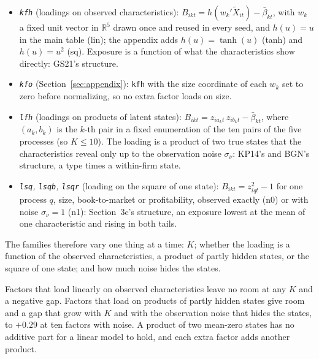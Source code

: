 \documentclass[11pt]{article}
\begin{document}
\begin{itemize}
  \begin{itemize}
  \item \emph{\texttt{kfh}} (loadings on observed characteristics): $B_{ikt}=h(w_k'\tilde X_{it})-\bar\beta_{kt}$, with $w_k$ a fixed unit vector in $\mathbb{R}^5$ drawn once and reused in every seed, and $h(u)=u$ in the main table (lin); the appendix adds $h(u)=\tanh(u)$ (tanh) and $h(u)=u^2$ (sq). Exposure is a function of what the characteristics show directly: GS21's structure.
  \item \emph{\texttt{kfo}} (Section~\ref{sec:appendix}): \texttt{kfh} with the size coordinate of each $w_k$ set to zero before normalizing, so no extra factor loads on size.
  \item \emph{\texttt{lfh}} (loadings on products of latent states): $B_{ikt}=z_{ia_kt}\,z_{ib_kt}-\bar\beta_{kt}$, where $(a_k,b_k)$ is the $k$-th pair in a fixed enumeration of the ten pairs of the five processes (so $K\le 10$). The loading is a product of two true states that the characteristics reveal only up to the observation noise $\sigma_\nu$: KP14's and BGN's structure, a type times a within-firm state.
  \item \emph{\texttt{lsq}, \texttt{lsqb}, \texttt{lsqr}} (loading on the square of one state): $B_{ikt}=z_{iqt}^2-1$ for one process $q$, size, book-to-market or profitability, observed exactly (n0) or with noise $\sigma_\nu=1$ (n1): Section~3c's structure, an exposure lowest at the mean of one characteristic and rising in both tails.
  \end{itemize}
\end{itemize}
The families therefore vary one thing at a time: $K$; whether the loading is a function of the observed characteristics, a product of partly hidden states, or the square of one state; and how much noise hides the states.


\noindent Factors that load linearly on observed characteristics leave no room at any $K$ and a negative gap. Factors that load on products of partly hidden states give room and a gap that grow with $K$ and with the observation noise that hides the states, to $+0.29$ at ten factors with noise. A product of two mean-zero states has no additive part for a linear model to hold, and each extra factor adds another product.
\end{document}
